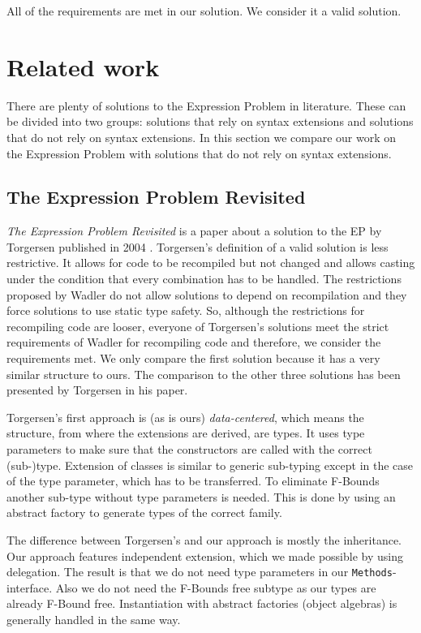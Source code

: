 \documentclass{report}
\begin{document}
All of the requirements are met in our solution. We consider it a valid solution.

\section{Related work}

There are plenty of solutions to the Expression Problem in literature. These can be divided into two groups: solutions that rely on syntax extensions and solutions that do not rely on syntax extensions. In this section we compare our work on the Expression Problem with solutions that do not rely on syntax extensions.

\subsection*{The Expression Problem Revisited}

\emph{The Expression Problem Revisited} is a paper about a solution to the EP by Torgersen published in 2004 \cite{Torgersen-Expression-2004}.
Torgersen's definition of a valid solution is less restrictive. It allows for code to be recompiled but not changed and allows casting under the condition that every combination has to be handled. The restrictions proposed by Wadler \cite{Wadler-Expression-1998} do not allow solutions to depend on recompilation and they force solutions to use static type safety. So, although the restrictions for recompiling code are looser, everyone of Torgersen's solutions meet the strict requirements of Wadler for recompiling code and therefore, we consider the requirements met. We only compare the first solution because it has a very similar structure to ours. The comparison to the other three solutions has been presented by Torgersen in his paper.

Torgersen's first approach is (as is ours) \emph{data-centered}, which means the structure, from where the extensions are derived, are types. It uses type parameters to make sure that the constructors are called with the correct (sub-)type. Extension of classes is similar to generic sub-typing except in the case of the type parameter, which has to be transferred. To eliminate F-Bounds another sub-type without type parameters is needed. This is done by using an abstract factory to generate types of the correct family.

The difference between Torgersen's and our approach is mostly the inheritance. Our approach features independent extension, which we made possible by using delegation. The result is that we do not need type parameters in our \lstinline{Methods}-interface. Also we do not need the F-Bounds free subtype as our types are already F-Bound free. Instantiation with abstract factories (object algebras) is generally handled in the same way.
\end{document}
